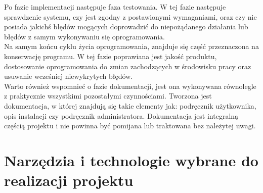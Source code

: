 \documentclass[12pt]{article}
\begin{document}
\begin{sloppypar}
{{    Po fazie implementacji następuje faza testowania. 
    W tej fazie następuje sprawdzenie systemu, czy jest zgodny z postawionymi wymaganiami, 
    oraz czy nie posiada jakichś błędów mogących doprowadzić do niepożądanego działania lub błędów z samym wykonywaniu się oprogramowania.\\
    Na samym końcu cyklu życia oprogramowania, znajduje się część przeznaczona na konserwację programu. 
    W tej fazie poprawiana jest jakość produktu, dostosowanie oprogramowania do zmian zachodzących w środowisku pracy oraz usuwanie wcześniej niewykrytych błędów.\\
    Warto również wspomnieć o fazie dokumentacji, jest ona wykonywana równolegle z praktycznie wszystkimi pozostałymi czynnościami. 
    Tworzona jest dokumentacja, w której znajdują się takie elementy jak: podręcznik użytkownika, opis instalacji czy podręcznik administratora. 
    Dokumentacja jest integralną częścią projektu i nie powinna być pomijana lub traktowana bez należytej uwagi.
  }
}

\section{Narzędzia i technologie wybrane do realizacji projektu}
{
}
\end{sloppypar}
\end{document}
